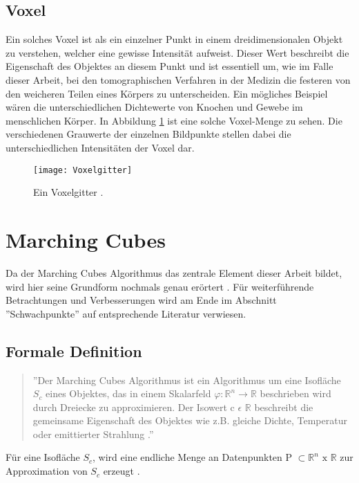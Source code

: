 \subsection{Voxel} 
Ein solches Voxel ist als ein einzelner Punkt in einem dreidimensionalen Objekt zu verstehen, welcher eine gewisse Intensität aufweist. Dieser Wert beschreibt die Eigenschaft des Objektes an diesem Punkt und ist essentiell um, wie im Falle dieser Arbeit, bei den tomographischen Verfahren in der Medizin die festeren von den weicheren Teilen eines Körpers zu unterscheiden. Ein mögliches Beispiel wären die unterschiedlichen Dichtewerte von Knochen und Gewebe im menschlichen Körper. In Abbildung \ref{fig:Voxelgitter} ist eine solche Voxel-Menge zu sehen. Die verschiedenen Grauwerte der einzelnen Bildpunkte stellen dabei die unterschiedlichen Intensitäten der Voxel dar.

\begin{figure}
	\centering
	\texttt{[image: Voxelgitter]}
	\caption{Ein Voxelgitter \citep{SeibtBak}.}
	\label{fig:Voxelgitter}
\end{figure}

\section{Marching Cubes}
Da der Marching Cubes Algorithmus das zentrale Element dieser Arbeit bildet, wird hier seine Grundform nochmals genau erörtert \citep{MCAlgo}. Für weiterführende Betrachtungen und Verbesserungen wird am Ende im Abschnitt ''Schwachpunkte'' auf entsprechende Literatur verwiesen.
\subsection{Formale Definition}
\begin{quote}
	''Der Marching Cubes Algorithmus ist ein Algorithmus um eine Isofläche $S_{c}$ eines Objektes, das in einem Skalarfeld  $\varphi : \mathbb{R}^{n} \rightarrow \mathbb{R }$ beschrieben wird durch Dreiecke zu approximieren. Der Isowert c $\epsilon$ $ \mathbb{ R} $ beschreibt die gemeinsame Eigenschaft des Objektes wie z.B. gleiche Dichte, Temperatur oder emittierter Strahlung \citep{WollmannBak}.''\\
\end{quote}

\noindent Für eine Isofläche $S_{c}$, wird eine endliche Menge an Datenpunkten P $\subset \mathbb{R}^{n} \text{ x } \mathbb{R}$ zur Approximation von $S_{c}$ erzeugt \citep{VisualHandbook}.

